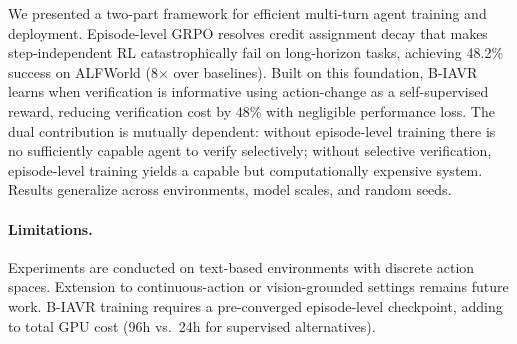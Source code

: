 \documentclass[11pt]{article}
\begin{document}
We presented a two-part framework for efficient multi-turn agent training and deployment. Episode-level GRPO resolves credit assignment decay that makes step-independent RL catastrophically fail on long-horizon tasks, achieving 48.2\% success on ALFWorld (8$\times$ over baselines). Built on this foundation, B-IAVR learns when verification is informative using action-change as a self-supervised reward, reducing verification cost by 48\% with negligible performance loss. The dual contribution is mutually dependent: without episode-level training there is no sufficiently capable agent to verify selectively; without selective verification, episode-level training yields a capable but computationally expensive system. Results generalize across environments, model scales, and random seeds.

\paragraph{Limitations.}
Experiments are conducted on text-based environments with discrete action spaces. Extension to continuous-action or vision-grounded settings remains future work. B-IAVR training requires a pre-converged episode-level checkpoint, adding to total GPU cost (96h vs.\ 24h for supervised alternatives).
\end{document}
